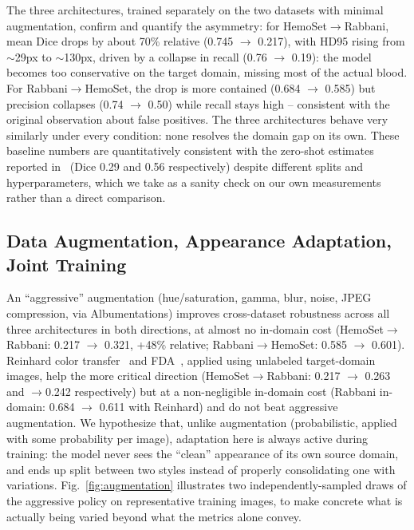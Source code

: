 \documentclass[10pt,conference]{IEEEtran}
\begin{document}
The three architectures, trained separately on the two datasets with minimal augmentation, confirm and quantify the asymmetry: for HemoSet$\rightarrow$Rabbani, mean Dice drops by about 70\% relative (0.745 $\rightarrow$ 0.217), with HD95 rising from $\sim$29px to $\sim$130px, driven by a collapse in recall (0.76 $\rightarrow$ 0.19): the model becomes too conservative on the target domain, missing most of the actual blood. For Rabbani$\rightarrow$HemoSet, the drop is more contained (0.684 $\rightarrow$ 0.585) but precision collapses (0.74 $\rightarrow$ 0.50) while recall stays high -- consistent with the original observation about false positives. The three architectures behave very similarly under every condition: none resolves the domain gap on its own. These baseline numbers are quantitatively consistent with the zero-shot estimates reported in~\cite{giusti2026report} (Dice 0.29 and 0.56 respectively) despite different splits and hyperparameters, which we take as a sanity check on our own measurements rather than a direct comparison.

\subsection{Data Augmentation, Appearance Adaptation, Joint Training}
\label{sec:results-b}

An ``aggressive'' augmentation (hue/saturation, gamma, blur, noise, JPEG compression, via Albumentations) improves cross-dataset robustness across all three architectures in both directions, at almost no in-domain cost (HemoSet$\rightarrow$Rabbani: 0.217 $\rightarrow$ 0.321, +48\% relative; Rabbani$\rightarrow$HemoSet: 0.585 $\rightarrow$ 0.601). Reinhard color transfer~\cite{reinhard2001color} and FDA~\cite{yang2020fda}, applied using unlabeled target-domain images, help the more critical direction (HemoSet$\rightarrow$Rabbani: 0.217 $\rightarrow$ 0.263 and $\rightarrow$0.242 respectively) but at a non-negligible in-domain cost (Rabbani in-domain: 0.684 $\rightarrow$ 0.611 with Reinhard) and do not beat aggressive augmentation. We hypothesize that, unlike augmentation (probabilistic, applied with some probability per image), adaptation here is always active during training: the model never sees the ``clean'' appearance of its own source domain, and ends up split between two styles instead of properly consolidating one with variations. Fig.~\ref{fig:augmentation} illustrates two independently-sampled draws of the aggressive policy on representative training images, to make concrete what is actually being varied beyond what the metrics alone convey.
\end{document}
